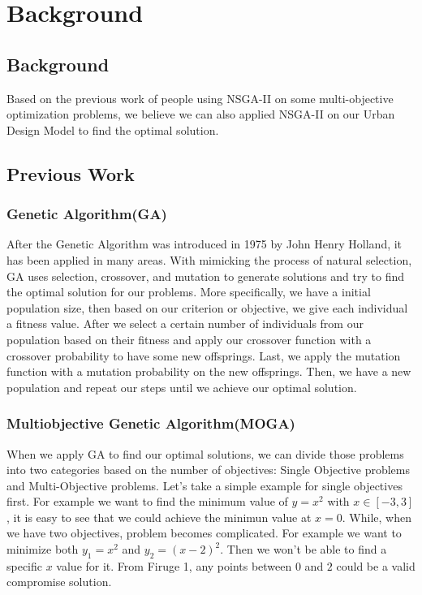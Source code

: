 \chapter{Background}
\label{chap:background}

\section{Background}
Based on the previous work of people using NSGA-II on some multi-objective optimization problems\cite{Magnier_2010_Multiobjective}, we believe we can also applied NSGA-II on our Urban Design Model to find the optimal solution. 

\section{Previous Work}

\subsection{Genetic Algorithm(GA)}
After the Genetic Algorithm was introduced in 1975 by John Henry Holland\cite{Holland_1975_Book}, it has been applied in many areas. With mimicking the process of natural selection, GA uses selection, crossover, and mutation to generate solutions and try to find the optimal solution for our problems. More specifically, we have a initial population size, then based on our criterion or objective, we give each individual a fitness value. After we select a certain number of individuals from our population based on their fitness and apply our crossover function with a crossover probability to have some new offsprings. Last, we apply the mutation function with a mutation probability on the new offsprings. Then, we have a new population and repeat our steps until we achieve our optimal solution.

\subsection{Multiobjective Genetic Algorithm(MOGA)}
When we apply GA to find our optimal solutions, we can divide those problems into two categories based on the number of objectives: Single Objective problems and Multi-Objective problems. Let's take a simple example for single objectives first. For example we want to find the minimum value of \(y=x^2\) with \(x\in [-3,3]\), it is easy to see that we could achieve the minimun value at \(x=0\). While, when we have two objectives, problem becomes complicated. For example we want to minimize both \(y_{1}=x^2\) and \(y_{2}=(x-2)^2\). Then we won't be able to find a specific \(x\) value for it. From Firuge 1, any points between \(0\) and \(2\) could be a valid compromise solution. 


